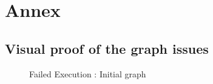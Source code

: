 \section*{Annex}

\subsection{Visual proof of the graph issues}
\begin{figure}[!h]
  \caption{Failed Execution : Initial graph}
  \begin{center}
    \begin{tikzpicture}[scale=0.9,transform shape]
      
    \end{tikzpicture}
  \end{center}
\end{figure}
